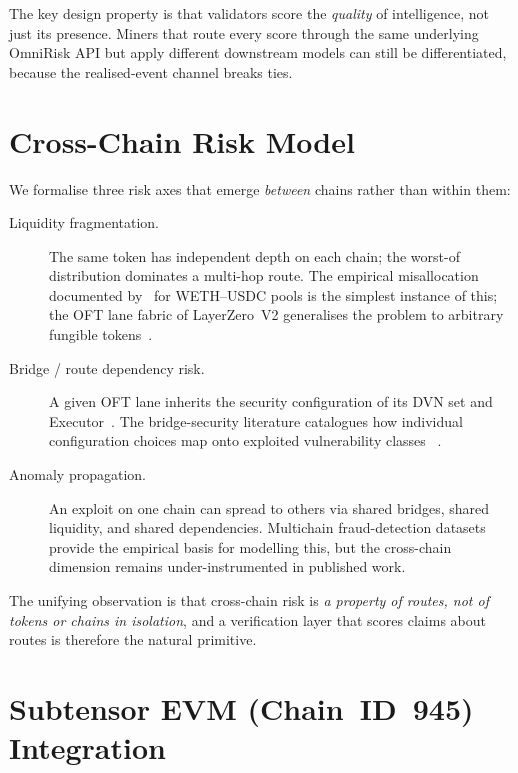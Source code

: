 \documentclass[11pt,a4paper]{article}
\begin{document}
The key design property is that validators score the \emph{quality} of intelligence, not
just its presence. Miners that route every score through the same underlying OmniRisk
API but apply different downstream models can still be differentiated, because the
realised-event channel breaks ties.

\section{Cross-Chain Risk Model}\label{sec:risk}

We formalise three risk axes that emerge \emph{between} chains rather than within them:
\begin{description}
  \item[Liquidity fragmentation.] The same token has independent depth on each chain;
        the worst-of distribution dominates a multi-hop route. The empirical
        misallocation documented by~\cite{gogol2024liquidity} for WETH--USDC pools is
        the simplest instance of this; the OFT lane fabric of LayerZero~V2 generalises
        the problem to arbitrary fungible tokens~\cite{layerzero2024oft}.
  \item[Bridge / route dependency risk.] A given OFT lane inherits the security
        configuration of its DVN set and Executor~\cite{zarick2024layerzero}. The
        bridge-security literature catalogues how individual configuration choices map
        onto exploited vulnerability classes
        ~\cite{zhang2023sok,augusto2024sok,wu2025safeguarding}.
  \item[Anomaly propagation.] An exploit on one chain can spread to others via shared
        bridges, shared liquidity, and shared dependencies. Multichain fraud-detection
        datasets~\cite{palaiokrassas2023multichain} provide the empirical basis for
        modelling this, but the cross-chain dimension remains under-instrumented in
        published work.
\end{description}
The unifying observation is that cross-chain risk is \emph{a property of routes, not of
tokens or chains in isolation}, and a verification layer that scores claims about routes
is therefore the natural primitive.

\section{Subtensor EVM (Chain~ID~945) Integration}\label{sec:subtensor}
\end{document}
